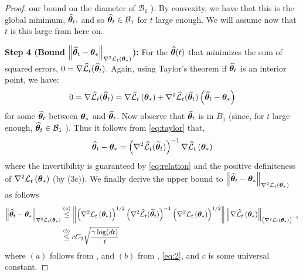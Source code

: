 \begin{proof}
our bound on the diameter of $\mathcal{B}_{1}$ ). By convexity, we have that this is the global minimum, ${\widehat{\bm{\theta}}}_{t},$ and so ${\widehat{\bm{\theta}}}_{t} \in \mathcal{B}_{1}$ for $t$ large enough. We will assume now that $t$ is this large from here on.



\textbf{Step 4 (Bound $\left\|{\widehat{\bm{\theta}}}_{t}-\bm{\theta}_{*}\right\|_{\nabla^{2} {\cal L}_t\left(\bm{\theta}_{*}\right)}$):} For the ${\widehat{\bm{\theta}}}(t)$ that minimizes the sum of squared errors, $0=\nabla \widehat{\cal L}_{t}({\widehat{\bm{\theta}}}_{t})$. Again, using Taylor's theorem if ${\widehat{\bm{\theta}}}_{t}$ is an interior point, we have:
\begin{align}
0=\nabla \widehat{\cal L}_{t}({\widehat{\bm{\theta}}}_{t})=\nabla \widehat{\cal L}_{t}\left(\bm{\theta}_{*}\right)+\nabla^{2} \widehat{\cal L}_{t}(\widetilde{\bm{\theta}}_{t})\left({\widehat{\bm{\theta}}}_{t}-\bm{\theta}_{*}\right)\label{eq:taylor}
\end{align}
for some $\widetilde{\bm{\theta}}_{t}$ between $\bm{\theta}_{*}$ and ${\widehat{\bm{\theta}}}_{t}$. Now observe that $\widetilde{\bm{\theta}}_{t}$ is in $B_{1}$ (since, for $t$ large enough, ${\widehat{\bm{\theta}}}_{t} \in \mathcal{B}_{1}$ ). Thus it follows from \eqref{eq:taylor} that,
\begin{align}
{\widehat{\bm{\theta}}}_{t} - \bm{\theta}_{*}=\left(\nabla^{2} \widehat{\cal L}_{t}(\widetilde{\bm{\theta}}_{t})\right)^{-1} \nabla \widehat{\cal L}_{t}\left(\bm{\theta}_{*}\right)    \label{eq:erm}
\end{align}
where the invertibility is guaranteed by \eqref{eq:relation} and the positive definiteness of $\nabla^2 {\cal L}_{t}\left(\bm{\theta}_{*}\right)$ (by  (3c)). We finally derive the upper bound to $\left\|{\widehat{\bm{\theta}}}_{t}-\bm{\theta}_{*}\right\|_{\nabla^{2} {\cal L}_{t}\left(\bm{\theta}_{*}\right)}$ as follows
\begin{align}
\left\|{\widehat{\bm{\theta}}}_{t}-\bm{\theta}_{*}\right\|_{\nabla^{2} {\cal L}_{t}\left(\bm{\theta}_{*}\right)} 
&\overset{(a)}{\leq} \left\|\left(\nabla^{2} {\cal L}_{t}\left(\bm{\theta}_{*}\right)\right)^{1 / 2}\left(\nabla^{2} \widehat{\cal L}_{t}(\widetilde{\bm{\theta}}_{t})\right)^{-1}\left(\nabla^{2} {\cal L}_{t}\left(\bm{\theta}_{*}\right)\right)^{1 / 2}\right\|\left\|\nabla \widehat{\cal L}_{t}\left(\bm{\theta}_{*}\right)\right\|_{\left(\nabla^{2} {\cal L}_{t}\left(\bm{\theta}_{*}\right)\right)^{-1}} \nonumber\\
&\overset{(b)}{\leq} c C_{2} \sqrt{\frac{\gamma \log (dt)}{t}} \label{eq:3}
\end{align}
where $(a)$ follows from , and $(b)$ from , \eqref{eq:2}, and $c$ is some universal constant.


\end{proof}
